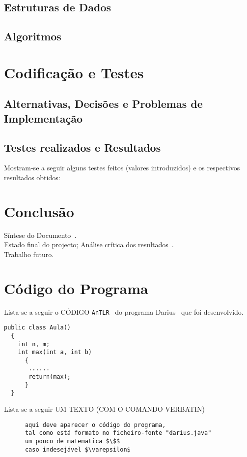 \documentclass[11pt,a4paper]{report}%
\def\darius{\textsf{Darius}\xspace}
\def\antlr{\texttt{AnTLR}\xspace}
\begin{document}
\section{Estruturas de Dados}
\section{Algoritmos}

\chapter{Codificação e Testes}
\section{Alternativas, Decisões e Problemas de Implementação}
\section{Testes realizados e Resultados}
Mostram-se a seguir alguns testes feitos (valores introduzidos) e
os respectivos resultados obtidos:


\chapter{Conclusão} \label{concl}
Síntese do Documento~\cite{araujo:2018,martini:2018}.\\
Estado final do projecto; Análise crítica dos resultados~\cite{Sto77a}.\\
Trabalho futuro.

\appendix %
\chapter{Código do Programa}

Lista-se a seguir o CÓDIGO \antlr~\cite{antlr:2016} do programa
\darius~\cite{maskin:1985} que foi desenvolvido.
\begin{verbatim}
public class Aula()
  {
    int n, m;
    int max(int a, int b)
      {
       ......
       return(max);
      }
  }
\end{verbatim}

Lista-se a seguir UM TEXTO (COM O COMANDO VERBATIN)
\begin{verbatim}
      aqui deve aparecer o código do programa,
      tal como está formato no ficheiro-fonte "darius.java"
      um pouco de matematica $\$$
      caso indesejável $\varepsilon$
\end{verbatim}
\end{document}

